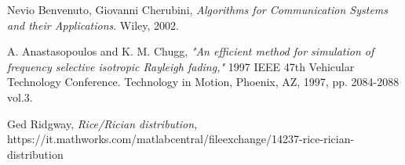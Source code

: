 \documentclass[a4paper,11.5pt]{article}
\begin{document}
\begin{thebibliography}{15}
	Nevio Benvenuto, Giovanni Cherubini,
	\textit{Algorithms for Communication Systems and their Applications}. 
	Wiley, 2002.
	
	A. Anastasopoulos and K. M. Chugg, 
	\textit{"An efficient method for simulation of frequency selective isotropic Rayleigh fading,"}
	1997 IEEE 47th Vehicular Technology Conference. Technology in Motion, Phoenix, AZ, 1997, pp. 2084-2088 vol.3.
	
	Ged Ridgway,
	\textit{Rice/Rician distribution,}\\
	https://it.mathworks.com/matlabcentral/fileexchange/14237-rice-rician-distribution
	
	
\end{thebibliography}
\end{document}
